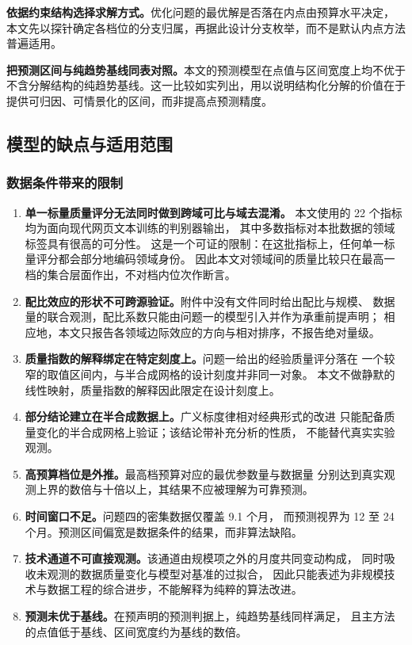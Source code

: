 \textbf{依据约束结构选择求解方式。}优化问题的最优解是否落在内点由预算水平决定，
本文先以探针确定各档位的分支归属，再据此设计分支枚举，而不是默认内点方法普遍适用。

\textbf{把预测区间与纯趋势基线同表对照。}本文的预测模型在点值与区间宽度上均不优于
不含分解结构的纯趋势基线。这一比较如实列出，用以说明结构化分解的价值在于
提供可归因、可情景化的区间，而非提高点预测精度。

\subsection{模型的缺点与适用范围}
\subsubsection{数据条件带来的限制}
\begin{enumerate}[label=(\arabic*),leftmargin=2.2em,itemsep=2pt]
  \item \textbf{单一标量质量评分无法同时做到跨域可比与域去混淆。}
    本文使用的 22 个指标均为面向现代网页文本训练的判别器输出，
    其中多数指标对本批数据的领域标签具有很高的可分性。
    这是一个可证的限制：在这批指标上，任何单一标量评分都会部分地编码领域身份。
    因此本文对领域间的质量比较只在最高一档的集合层面作出，不对档内位次作断言。
  \item \textbf{配比效应的形状不可跨源验证。}附件中没有文件同时给出配比与规模、
    数据量的联合观测，配比系数只能由问题一的模型引入并作为承重前提声明；
    相应地，本文只报告各领域边际效应的方向与相对排序，不报告绝对量级。
  \item \textbf{质量指数的解释绑定在特定刻度上。}问题一给出的经验质量评分落在
    一个较窄的取值区间内，与半合成网格的设计刻度并非同一对象。
    本文不做静默的线性映射，质量指数的解释因此限定在设计刻度上。
  \item \textbf{部分结论建立在半合成数据上。}广义标度律相对经典形式的改进
    只能配备质量变化的半合成网格上验证；该结论带补充分析的性质，
    不能替代真实实验观测。
  \item \textbf{高预算档位是外推。}最高档预算对应的最优参数量与数据量
    分别达到真实观测上界的数倍与十倍以上，其结果不应被理解为可靠预测。
  \item \textbf{时间窗口不足。}问题四的密集数据仅覆盖 9.1 个月，
    而预测视界为 12 至 24 个月。预测区间偏宽是数据条件的结果，而非算法缺陷。
  \item \textbf{技术通道不可直接观测。}该通道由规模项之外的月度共同变动构成，
    同时吸收未观测的数据质量变化与模型对基准的过拟合，
    因此只能表述为非规模技术与数据工程的综合进步，不能解释为纯粹的算法改进。
  \item \textbf{预测未优于基线。}在预声明的预测判据上，纯趋势基线同样满足，
    且主方法的点值低于基线、区间宽度约为基线的数倍。
\end{enumerate}


